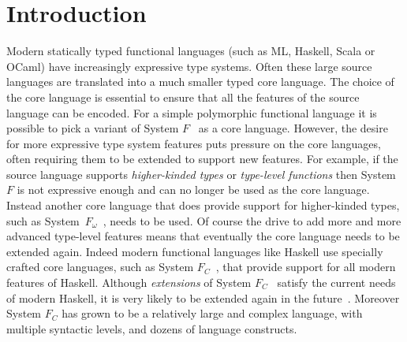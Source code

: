 \section{Introduction}

Modern statically typed functional languages (such as ML, Haskell,
Scala or OCaml) have increasingly expressive type systems. Often these
large source languages are translated into a much smaller typed core
language. The choice of the core language is essential to ensure that
all the features of the source language can be encoded. For a simple
polymorphic functional language it is possible to pick a
variant of System $F$~\cite{systemfw,Reynolds:1974} as a core
language. However, the desire for more expressive type system features
puts pressure on the core languages, often requiring them to be
extended to support new features.  For example, if the source language
supports \emph{higher-kinded types} or \emph{type-level functions}
then System $F$ is not expressive enough and can no longer be used as
the core language. Instead another core language that does provide
support for higher-kinded types, such as
System~$F_{\omega}$~\cite{systemfw}, needs to be used. Of course the
drive to add more and more advanced type-level features means that
eventually the core language needs to be extended again. Indeed modern
functional languages like Haskell use specially crafted core
languages, such as System $F_{C}$~\cite{fc}, that provide support for all
modern features of Haskell. Although \emph{extensions} of System
$F_{C}$~\cite{fc:pro,Eisenberg:2014} satisfy the current needs of
modern Haskell, it is very likely to be extended again in the
future~\cite{fc:kind}. Moreover System $F_{C}$ has grown to be a relatively
large and complex language, with multiple syntactic levels, and dozens
of language constructs.

\begin{comment}
However System~$F_{\omega}$ is
significantly more complex than System F and thus harder to
maintain. If later a new feature, such as \emph{kind polymorphism}, is
desired the core language may need to be changed again to account for
the new feature, introducing at the same time new sources of
complexity. Indeed the core language for modern versions of 
functional languages are quite complex, having multiple syntactic 
sorts (such as terms, types and kinds), as well as dozens of 
language constructs~\cite{}\bruno{$F_{C}$}. 
\end{comment}

